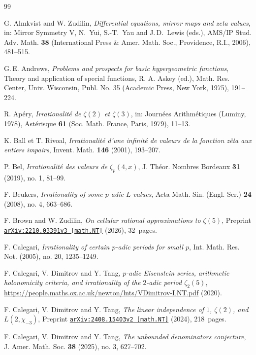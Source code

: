 \documentclass[12pt]{article}
\theoremstyle{remark}
\numberwithin{equation}{section}
\begin{document}
\begin{thebibliography}{99}

 G. Almkvist and W. Zudilin,
\textit{Differential equations, mirror maps and zeta values},
in: Mirror Symmetry V, N.~Yui, S.-T.~Yau and J.\,D.~Lewis (eds.), AMS/IP Stud. Adv. Math. \textbf{38} (International Press \& Amer. Math. Soc., Providence, R.I., 2006), 481--515.

 G.\,E. Andrews, \textit{Problems and prospects for basic hypergeometric functions}, Theory and application of special functions, R. A. Askey (ed.), Math. Res. Center, Univ. Wisconsin, Publ. No. 35 (Academic Press, New York, 1975), 191--224.

 R. Ap\'ery, \textit{Irrationalit{\'e} de $\zeta(2)$ et $\zeta(3)$}, in: Journ\'ees Arithm\'etiques (Luminy, 1978), Ast\'erisque \textbf{61} (Soc. Math. France, Paris, 1979), 11--13.

 K. Ball et T. Rivoal, \textit{Irrationalit\'e d'une infinit\'e de valeurs de la fonction z\^eta aux entiers impairs}, Invent. Math. \textbf{146} (2001), 193--207.

 P. Bel, \textit{Irrationalit\'e des valeurs de $\zeta_p(4,x)$}, J. Th\'eor. Nombres Bordeaux \textbf{31} (2019), no. 1, 81--99.

 F. Beukers, \textit{Irrationality of some $p$-adic $L$-values}, Acta Math. Sin. (Engl. Ser.) \textbf{24} (2008), no. 4, 663--686.

 F. Brown and W. Zudilin,
\textit{On cellular rational approximations to $\zeta(5)$},
Preprint \href{https://arxiv.org/abs/2210.03391v3}{{\tt arXiv:2210.03391v3 [math.NT]}} (2026), 32~pages.

 F. Calegari, \textit{Irrationality of certain $p$-adic periods for small $p$}, Int. Math. Res. Not. (2005), no. 20, 1235--1249.

 F. Calegari, V. Dimitrov and Y. Tang, \textit{$p$-adic Eisenstein series, arithmetic holonomicity criteria, and irrationality of the $2$-adic period $\zeta_2(5)$}, \url{https://people.maths.ox.ac.uk/newton/lnts/VDimitrov-LNT.pdf} (2020).

 F. Calegari, V. Dimitrov and Y. Tang, \textit{The linear independence of $1$, $\zeta(2)$, and $L(2,\chi_{-3})$}, Preprint \href{https://arxiv.org/abs/2408.15403v2}{{\tt arXiv:2408.15403v2 [math.NT]}} (2024), 218~pages.

 F. Calegari, V. Dimitrov and Y. Tang, \textit{The unbounded denominators conjecture}, J. Amer. Math. Soc. \textbf{38} (2025), no. 3, 627--702.


\end{thebibliography}
\end{document}

